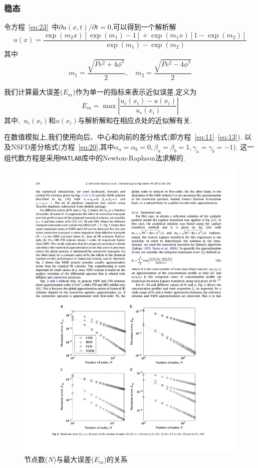 \documentclass[a4paper,cs4size,adobefonts,cm-default,no-math]{ctexart}
\begin{document}
\subsubsection{稳态}
令方程~\ref{eq:23}~中$\partial u(x,t)/\partial t=0$,可以得到一个解析解
\begin{equation}\label{eq:24}
 u(x)=\dfrac{\exp(m_2 x)[\exp(m_1)-1]+\exp(m_1 x)[1-\exp(m_2)]}{\exp(m_1)-\exp(m_2)}
\end{equation}
其中
\begin{equation*}
 m_1=\dfrac{\sqrt{Pe^2+4\phi^2}}{2},\quad m_2=\dfrac{\sqrt{Pe^2-4\phi^2}}{2}
\end{equation*}\par
我们计算最大误差($E_m$)作为单一的指标来表示近似误差,定义为
\begin{equation}\label{eq:25}
 E_m = \max\left|\dfrac{u_e(x_i)-u(x_i)}{u_e(x_i)}\right|
\end{equation}
其中,~$u_e(x_i)$和$u(x_i)$与解析解和在相应点处的近似解有关.\par
在数值模拟上,我们使用向后、中心和向前的差分格式(即方程~\ref{eq:11}--\ref{eq:13}).
以及NSFD差分格式(方程~\ref{eq:20},其中$\alpha_a=\alpha_b=0,\beta_a=\beta_b=1,\gamma_a=\gamma_b=-1$).
这一组代数方程是采用\texttt{MATLAB}库中的Newton-Raphson法求解的.\par
\begin{figure}
\centering
\includegraphics[trim=80 60 80 375,clip]{./pic/f2.pdf}
\caption{节点数($N$)与最大误差($E_m$)的关系}\label{fig:2}
\end{figure}\par
\end{document}
